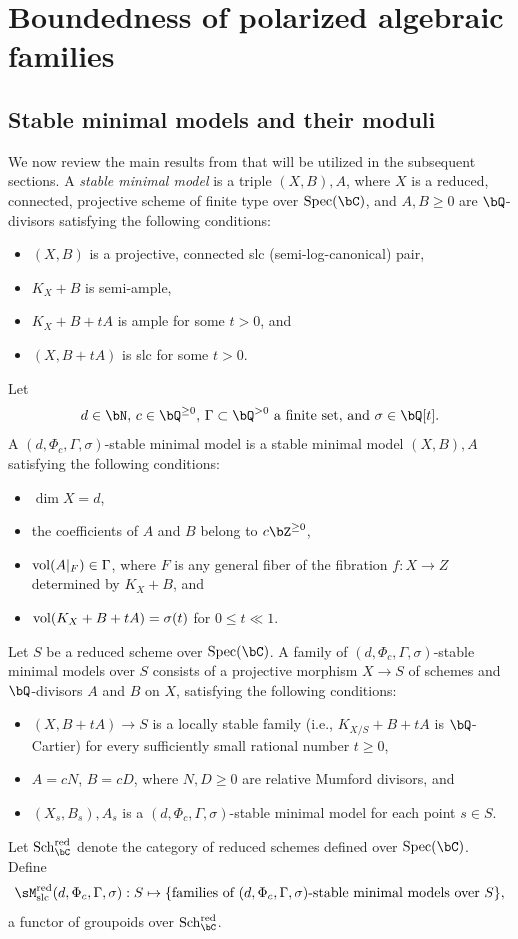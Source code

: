 \documentclass[11pt,letterpaper]{amsart}
\numberwithin{equation}{section}
\begin{document}
	\section{Boundedness of polarized algebraic families}\label{section_boundedness}
	\subsection{Stable minimal models and their moduli}\label{section_moduli}
	We now review the main results from \cite{Birkar2022} that will be utilized in the subsequent sections. A \emph{stable minimal model} is a triple $(X, B), A$, where $X$ is a reduced, connected, projective scheme of finite type over ${\rm Spec}(\bC)$, and $A, B \geq 0$ are $\bQ$-divisors satisfying the following conditions:  
	\begin{itemize}  
		\item $(X, B)$ is a projective, connected slc (semi-log-canonical) pair,  
		\item $K_X + B$ is semi-ample,  
		\item $K_X + B + tA$ is ample for some $t > 0$, and  
		\item $(X, B + tA)$ is slc for some $t > 0$.  
	\end{itemize}  
	Let  
	$$
	d \in \bN, \, c \in \bQ^{\geq 0}, \, \Gamma \subset \bQ^{>0} \text{ a finite set, and } \sigma \in \bQ[t].
	$$  
	A $(d, \Phi_c, \Gamma, \sigma)$-stable minimal model is a stable minimal model $(X, B), A$ satisfying the following conditions:  
	\begin{itemize}  
		\item $\dim X = d$,  
		\item the coefficients of $A$ and $B$ belong to $c \bZ^{\geq 0}$,  
		\item ${\rm vol}(A|_F) \in \Gamma$, where $F$ is any general fiber of the fibration $f: X \to Z$ determined by $K_X + B$, and  
		\item ${\rm vol}(K_X + B + tA) = \sigma(t)$ for $0 \leq t \ll 1$.  
	\end{itemize}  
	Let $S$ be a reduced scheme over ${\rm Spec}(\bC)$. A family of $(d, \Phi_c, \Gamma, \sigma)$-stable minimal models over $S$ consists of a projective morphism $X \to S$ of schemes and $\bQ$-divisors $A$ and $B$ on $X$, satisfying the following conditions:  
	\begin{itemize}  
		\item $(X, B + tA) \to S$ is a locally stable family (i.e., $K_{X/S} + B + tA$ is $\bQ$-Cartier) for every sufficiently small rational number $t \geq 0$,  
		\item $A = cN$, $B = cD$, where $N, D \geq 0$ are relative Mumford divisors, and  
		\item $(X_s, B_s), A_s$ is a $(d, \Phi_c, \Gamma, \sigma)$-stable minimal model for each point $s \in S$.  
	\end{itemize} 
	Let ${\rm Sch}_{\bC}^{\rm red}$ denote the category of reduced schemes defined over ${\rm Spec}(\bC)$. Define  
	$$
	\sM^{\rm red}_{\rm slc}(d, \Phi_c, \Gamma, \sigma): S \mapsto \{\text{families of } (d, \Phi_c, \Gamma, \sigma)\text{-stable minimal models over } S\},
	$$  
	a functor of groupoids over ${\rm Sch}_{\bC}^{\rm red}$.  
	
\end{document}
